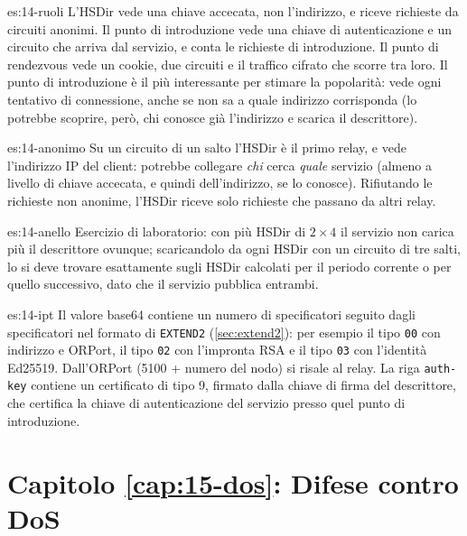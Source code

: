 \begin{soluzione}{es:14-ruoli}
L'HSDir vede una chiave accecata, non l'indirizzo, e riceve richieste da circuiti anonimi. Il punto di introduzione vede una chiave di autenticazione e un circuito che arriva dal servizio, e conta le richieste di introduzione. Il punto di rendezvous vede un cookie, due circuiti e il traffico cifrato che scorre tra loro. Il punto di introduzione è il più interessante per stimare la popolarità: vede ogni tentativo di connessione, anche se non sa a quale indirizzo corrisponda (lo potrebbe scoprire, però, chi conosce già l'indirizzo e scarica il descrittore).
\end{soluzione}

\begin{soluzione}{es:14-anonimo}
Su un circuito di un salto l'HSDir è il primo relay, e vede l'indirizzo IP del client: potrebbe collegare \emph{chi} cerca \emph{quale} servizio (almeno a livello di chiave accecata, e quindi dell'indirizzo, se lo conosce). Rifiutando le richieste non anonime, l'HSDir riceve solo richieste che passano da altri relay.
\end{soluzione}

\begin{soluzione}{es:14-anello}
Esercizio di laboratorio: con più HSDir di $2 \times 4$ il servizio non carica più il descrittore ovunque; scaricandolo da ogni HSDir con un circuito di tre salti, lo si deve trovare esattamente sugli HSDir calcolati per il periodo corrente o per quello successivo, dato che il servizio pubblica entrambi.
\end{soluzione}

\begin{soluzione}{es:14-ipt}
Il valore base64 contiene un numero di specificatori seguito dagli specificatori nel formato di \texttt{EXTEND2} (\cref{sec:extend2}): per esempio il tipo \texttt{00} con indirizzo e ORPort, il tipo \texttt{02} con l'impronta RSA e il tipo \texttt{03} con l'identità Ed25519. Dall'ORPort (5100 + numero del nodo) si risale al relay. La riga \texttt{auth-key} contiene un certificato di tipo 9, firmato dalla chiave di firma del descrittore, che certifica la chiave di autenticazione del servizio presso quel punto di introduzione.
\end{soluzione}

\section*{Capitolo \ref{cap:15-dos}: Difese contro DoS}

